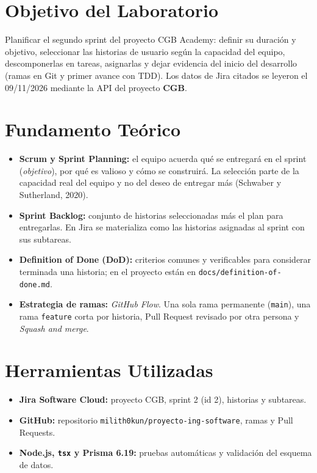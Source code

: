 \documentclass[11pt,a4paper]{article}
\begin{document}
\tableofcontents
\newpage

\section{Objetivo del Laboratorio}

Planificar el segundo sprint del proyecto CGB Academy: definir su duración y objetivo, seleccionar las historias de usuario según la capacidad del equipo, descomponerlas en tareas, asignarlas y dejar evidencia del inicio del desarrollo (ramas en Git y primer avance con TDD). Los datos de Jira citados se leyeron el 09/11/2026 mediante la API del proyecto \textbf{CGB}.

\section{Fundamento Teórico}

\begin{itemize}[leftmargin=1.5cm]
    \item \textbf{Scrum y Sprint Planning:} el equipo acuerda qué se entregará en el sprint (\textit{objetivo}), por qué es valioso y cómo se construirá. La selección parte de la capacidad real del equipo y no del deseo de entregar más (Schwaber y Sutherland, 2020).
    \item \textbf{Sprint Backlog:} conjunto de historias seleccionadas más el plan para entregarlas. En Jira se materializa como las historias asignadas al sprint con sus subtareas.
    \item \textbf{Definition of Done (DoD):} criterios comunes y verificables para considerar terminada una historia; en el proyecto están en \texttt{docs/definition-of-done.md}.
    \item \textbf{Estrategia de ramas:} \textit{GitHub Flow}. Una sola rama permanente (\texttt{main}), una rama \texttt{feature} corta por historia, Pull Request revisado por otra persona y \textit{Squash and merge}.
\end{itemize}

\section{Herramientas Utilizadas}

\begin{itemize}[leftmargin=1.5cm]
    \item \textbf{Jira Software Cloud:} proyecto CGB, sprint 2 (id 2), historias y subtareas.
    \item \textbf{GitHub:} repositorio \texttt{milith0kun/proyecto-ing-software}, ramas y Pull Requests.
    \item \textbf{Node.js, \texttt{tsx} y Prisma 6.19:} pruebas automáticas y validación del esquema de datos.
\end{itemize}
\end{document}
